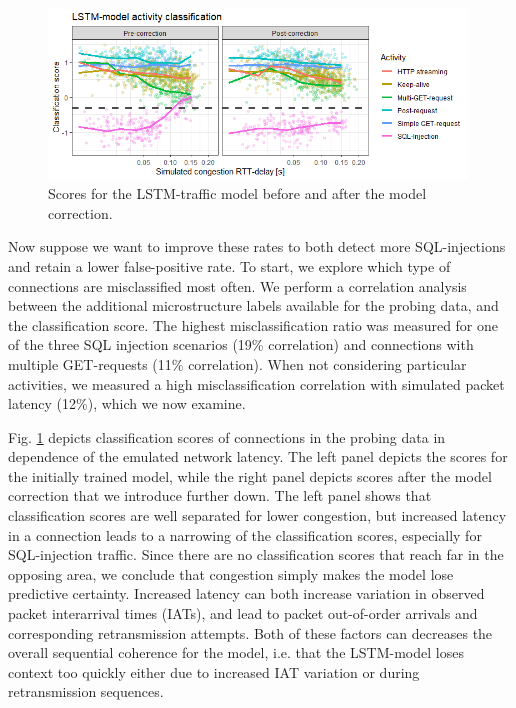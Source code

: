 \documentclass[runningheads]{llncs}
\begin{document}
\begin{figure}
\centering
\includegraphics[width=0.99\textwidth]{images/LSTM_classi.png}
\caption{Scores for the LSTM-traffic model before and after the model correction.}\label{fig:LSTM_exp}
\end{figure}


Now suppose we want to improve these rates to both detect more SQL-injections and retain a lower false-positive rate. To start, we explore which type of connections are misclassified most often. We perform a correlation analysis between the additional microstructure labels available for the probing data, and the classification score. The highest misclassification ratio was measured for one of the three SQL injection scenarios  (19\% correlation) and connections with multiple GET-requests (11\% correlation). When not considering particular activities, we measured a high misclassification correlation with simulated packet latency (12\%), which we now examine.



Fig. \ref{fig:LSTM_exp} depicts classification scores of connections in the probing data in dependence of the emulated network latency. The left panel depicts the scores for the initially trained model, while the right panel depicts scores after the model correction that we introduce further down. 
The left panel shows that classification scores are well separated for lower congestion, but increased latency in a connection leads to a narrowing of the classification scores, especially for SQL-injection traffic. Since there are no classification scores that reach far in the opposing area, we conclude that congestion simply makes the model lose predictive certainty. 
Increased latency can both increase variation in observed packet interarrival times (IATs), and lead to packet out-of-order arrivals and corresponding retransmission attempts. Both of these factors can decreases the overall sequential coherence for the model, i.e. that the LSTM-model loses context too quickly either due to increased IAT variation or during retransmission sequences. 
\end{document}
